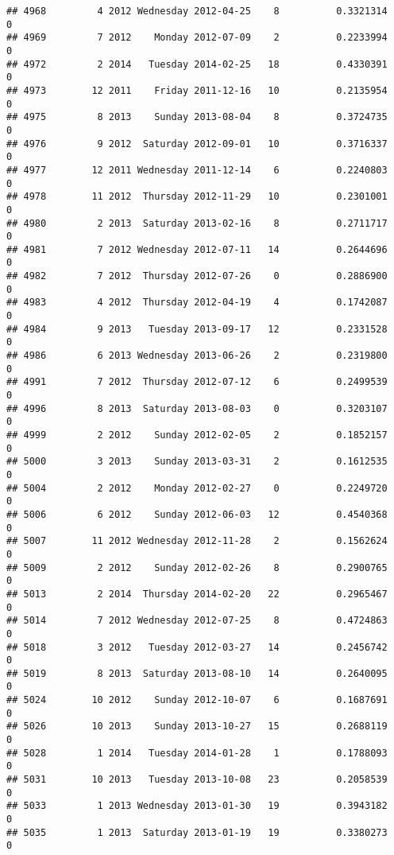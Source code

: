 \documentclass[
]{article}
\begin{document}
\begin{verbatim}
## 4968         4 2012 Wednesday 2012-04-25    8          0.3321314             0
## 4969         7 2012    Monday 2012-07-09    2          0.2233994             0
## 4972         2 2014   Tuesday 2014-02-25   18          0.4330391             0
## 4973        12 2011    Friday 2011-12-16   10          0.2135954             0
## 4975         8 2013    Sunday 2013-08-04    8          0.3724735             0
## 4976         9 2012  Saturday 2012-09-01   10          0.3716337             0
## 4977        12 2011 Wednesday 2011-12-14    6          0.2240803             0
## 4978        11 2012  Thursday 2012-11-29   10          0.2301001             0
## 4980         2 2013  Saturday 2013-02-16    8          0.2711717             0
## 4981         7 2012 Wednesday 2012-07-11   14          0.2644696             0
## 4982         7 2012  Thursday 2012-07-26    0          0.2886900             0
## 4983         4 2012  Thursday 2012-04-19    4          0.1742087             0
## 4984         9 2013   Tuesday 2013-09-17   12          0.2331528             0
## 4986         6 2013 Wednesday 2013-06-26    2          0.2319800             0
## 4991         7 2012  Thursday 2012-07-12    6          0.2499539             0
## 4996         8 2013  Saturday 2013-08-03    0          0.3203107             0
## 4999         2 2012    Sunday 2012-02-05    2          0.1852157             0
## 5000         3 2013    Sunday 2013-03-31    2          0.1612535             0
## 5004         2 2012    Monday 2012-02-27    0          0.2249720             0
## 5006         6 2012    Sunday 2012-06-03   12          0.4540368             0
## 5007        11 2012 Wednesday 2012-11-28    2          0.1562624             0
## 5009         2 2012    Sunday 2012-02-26    8          0.2900765             0
## 5013         2 2014  Thursday 2014-02-20   22          0.2965467             0
## 5014         7 2012 Wednesday 2012-07-25    8          0.4724863             0
## 5018         3 2012   Tuesday 2012-03-27   14          0.2456742             0
## 5019         8 2013  Saturday 2013-08-10   14          0.2640095             0
## 5024        10 2012    Sunday 2012-10-07    6          0.1687691             0
## 5026        10 2013    Sunday 2013-10-27   15          0.2688119             0
## 5028         1 2014   Tuesday 2014-01-28    1          0.1788093             0
## 5031        10 2013   Tuesday 2013-10-08   23          0.2058539             0
## 5033         1 2013 Wednesday 2013-01-30   19          0.3943182             0
## 5035         1 2013  Saturday 2013-01-19   19          0.3380273             0

\end{verbatim}
\end{document}

